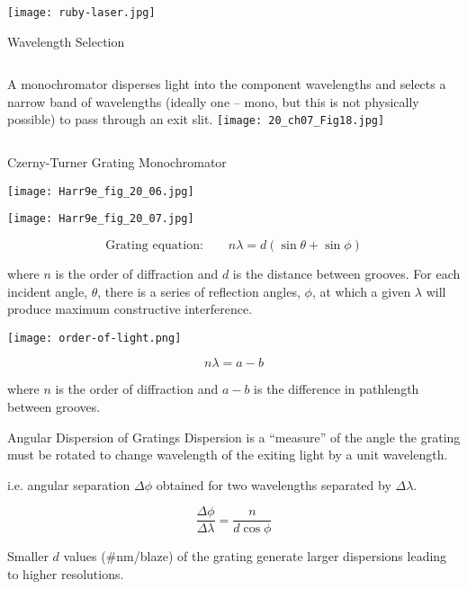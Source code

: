 \documentclass[handout]{beamer}
\begin{document}
\begin{frame}
	\texttt{[image: ruby-laser.jpg]}
\end{frame}

\begin{frame}{Wavelength Selection}
	\begin{columns}
		A \alert{monochromator} disperses light into the
		component wavelengths and selects a narrow band
		of wavelengths (ideally one -- mono, but this is
		not physically possible) to pass through an exit
		slit.
		\texttt{[image: 20\_ch07\_Fig18.jpg]}
	\end{columns}
\end{frame}

\begin{frame}[allowframebreaks]{Czerny-Turner Grating Monochromator}
	\begin{center}
		\texttt{[image: Harr9e\_fig\_20\_06.jpg]}
	\end{center}

	\framebreak

	\begin{center}
		\texttt{[image: Harr9e\_fig\_20\_07.jpg]}
	\end{center}

	\begin{equation*}
		\text{Grating equation:} \qquad n\lambda = d(\sin\theta +
		\sin\phi)
	\end{equation*}

	where $n$ is the order of diffraction and $d$ is the distance between
	grooves. For each incident angle, $\theta$, there is a series of
	reflection angles, $\phi$, at which a given $\lambda$ will produce
	maximum constructive interference.

	\framebreak

	\begin{center}
		\texttt{[image: order-of-light.png]}
	\end{center}

	\begin{equation*}
		n\lambda = a - b
	\end{equation*}

	where $n$ is the order of diffraction and $a - b$ is the difference in
	pathlength between grooves.
\end{frame}

\begin{frame}{Angular Dispersion of Gratings}
	Dispersion is a ``measure'' of the angle the grating must be rotated to
	change wavelength of the exiting light by a unit wavelength.

	i.e. angular separation $\Delta \phi$ obtained for two wavelengths
	separated by $\Delta \lambda$.

	\begin{equation*}
		\frac{\Delta\phi}{\Delta\lambda} = \frac{n}{d\cos\phi}
	\end{equation*}

	Smaller $d$ values (\#\si{\nano\meter}/blaze) of the grating generate
	larger dispersions leading to higher \alert{resolutions}.
\end{frame}
\end{document}
